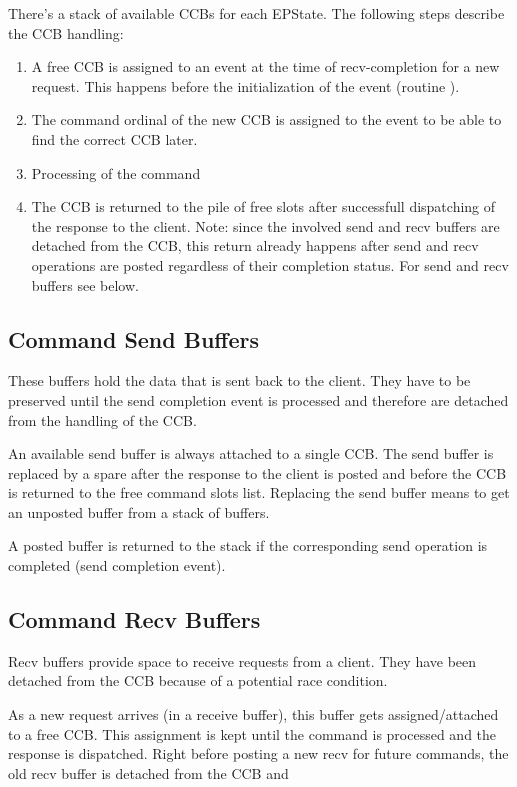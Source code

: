 There's a stack of available CCBs for each EPState.  The following
steps describe the CCB handling:
\begin{enumerate}
\item A free CCB is assigned to an event at the time of
  recv-completion for a new request.  This happens before the
  initialization of the event (routine ).
\item The command ordinal of the new CCB is assigned to the event to
  be able to find the correct CCB later.
\item Processing of the command
\item The CCB is returned to the pile of free slots after successfull
  dispatching of the response to the client.  Note: since the involved
  send and recv buffers are detached from the CCB, this return already
  happens after send and recv operations are posted regardless of
  their completion status.  For send and recv buffers see below.
\end{enumerate}


\subsection{Command Send Buffers}
These buffers hold the data that is sent back to the client.  They
have to be preserved until the send completion event is processed and
therefore are detached from the handling of the CCB.

An available send buffer is always attached to a single CCB.  The send
buffer is replaced by a spare after the response to the client is
posted and before the CCB is returned to the free command slots list.
Replacing the send buffer means to get an unposted buffer from a stack
of buffers.

A posted buffer is returned to the stack if the corresponding send
operation is completed (send completion event).



\subsection{Command Recv Buffers}
Recv buffers provide space to receive requests from a client.  They
have been detached from the CCB because of a potential race
condition.

As a new request arrives (in a receive buffer), this buffer gets
assigned/attached to a free CCB.  This assignment is kept until the
command is processed and the response is dispatched.  Right before
posting a new recv for future commands, the old recv buffer is
detached from the CCB and 


